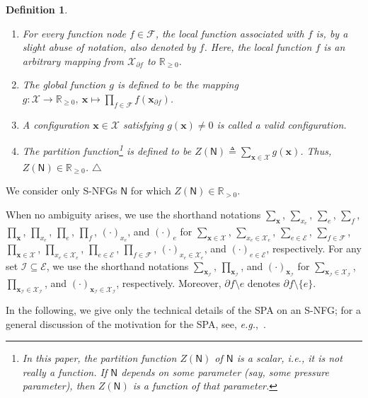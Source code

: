 \documentclass[journal]{IEEEtran}
\newcommand{\add}[1]{{\color{black}#1}}
\newtheorem{definition}[theorem]{Definition}
\newcommand{\manualendsymbol}[1]{%
  \leavevmode\unskip\penalty9999\hbox{}\nobreak\hfill
  \quad\hbox{#1}}
\newcommand{\edefinition}{\manualendsymbol{\ensuremath{\triangle}}}
\newcommand{\vect}[1]{ \bm{#1} }
\newcommand{\set}[1]{\mathcal{#1}}
\newcommand{\setEfull}{ \mathcal{E} }
\newcommand{\setF}{ \mathcal{F} }
\newcommand{\setpf}{ \partial f }
\newcommand{\xe}{ x_{e} }
\newcommand{\setxe}{ \mathcal{X}_{e} }
\newcommand{\setx}{ \mathcal{X} }
\newcommand{\setxf}{ \mathcal{X}_{\setpf} }
\newcommand{\vx}{ \vect{x} }
\newcommand{\graphN}{ \mathsf{N} }
\newcommand{\defeq}{ \triangleq }
\newcommand{\sRp}{ \mathbb{R}_{\geq 0} }
\newcommand{\sRpp}{ \mathbb{R}_{> 0} }
\newcommand{\xf}{ \bm{x}_{\setpf} }
\newcommand*{\ie}{\textit{i.e.}}
\newcommand*{\eg}{\textit{e.g.}}
\begin{document}
\begin{definition}
\begin{enumerate}
    \item For every function node $f \in \setF$, the local function associated
          with $f$ is, by a slight abuse of notation, \add{also denoted by
            $f$}. Here, the local function $f$ is an arbitrary mapping from $\setxf$
          to $\sRp$.

    \item The global function $g$ is defined to be the mapping
          $g:\set{X}\to \sRp, \ \vx\mapsto \prod_{f \in \setF} f(\xf)$.

    \item A configuration $\vx \in \set{X}$ satisfying $g(\vx) \neq 0$ is called
          a valid configuration.

    \item The partition function\footnote{In this paper, the partition function
            $Z(\graphN)$ of $\graphN$ is a scalar, \ie, it is not really a
            function. If $\graphN$ depends on some parameter (say, some pressure
            parameter), then $Z(\graphN)$ is a function of that parameter.} is
          defined to be $Z(\graphN) \defeq \sum_{\vx \in
              \set{X}}g(\vx)$. \add{Thus,} $Z(\graphN) \in \sRp$.\edefinition

  \end{enumerate}
\end{definition}

\add{We consider only S-NFGs $\graphN$ for which}
$Z(\graphN) \in \sRpp$.

\add{When no ambiguity arises, we use the shorthand notations}
$\sum_{\vx}$, $\sum_{\xe}$, $\sum_e$, $\sum_{f}$,
$\prod_{\vx}$, $\prod_{\xe}$, $\prod_e$, $\prod_{f}$,
$ (\cdot)_{\xe} $,
and
$ (\cdot)_{e} $ for
$\sum_{\vx \in \set{X}}$,
$\sum_{\xe\in\setxe}$,
$\sum_{e \in \setEfull}$, $\sum_{f \in \setF}$,
$\prod_{\vx \in \set{X}}$,
$\prod_{\xe \in \setxe}$, $\prod_{e \in \setEfull}$, $\prod_{f \in \setF}$,
$ (\cdot)_{\xe \in \setxe} $,
and
$ (\cdot)_{e\in \setEfull} $,
respectively.
For any set $ \set{I} \subseteq \setEfull $, we use the shorthand notations
$\sum_{\vx_{\set{I}}}$,
$\prod_{\vx_{\set{I}}}$,
and $ (\cdot)_{\vx_{\set{I}}} $
for
$\sum_{ \vx_{\set{I}} \in \setx_{\set{I}} }$,
$\prod_{ \vx_{\set{I}} \in \setx_{\set{I}} }$,
and $ (\cdot)_{ \vx_{\set{I}} \in \setx_{\set{I}} } $, respectively.
Moreover, $\setpf \setminus e$ \add{denotes}
$\setpf \setminus \{ e \}$.

\add{In the following, we give only the technical details of the SPA on an
  S-NFG; for a general discussion of the motivation for the SPA, see,
  \eg,~\cite{Kschischang2001,Loeliger2004}.}
\end{document}
